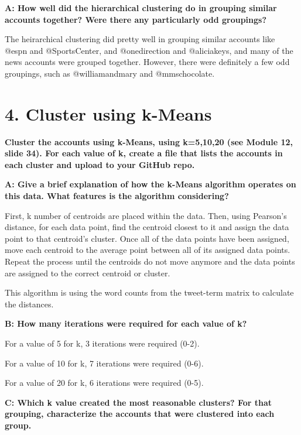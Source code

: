 \documentclass[12pt]{article}
\begin{document}
\clearpage

\noindent \textbf{A: How well did the hierarchical clustering do in grouping similar accounts together? Were there any particularly odd groupings?}

The heirarchical clustering did pretty well in grouping similar accounts like @espn and @SportsCenter, and @onedirection and @aliciakeys, and many of the news accounts were grouped together. However, there were definitely a few odd groupings, such as @williamandmary and @mmschocolate.  

\section*{4. Cluster using k-Means}
\noindent \textbf{Cluster the accounts using k-Means, using k=5,10,20 (see Module 12, slide 34). For each value of k, create a file that lists the accounts in each cluster and upload to your GitHub repo.}

\noindent \textbf{A: Give a brief explanation of how the k-Means algorithm operates on this data. What features is the algorithm considering?}

First, k number of centroids are placed within the data. Then, using Pearson's distance, for each data point, find the centroid closest to it and assign the data point to that centroid's cluster. Once all of the data points have been assigned, move each centroid to the average point between all of its assigned data points. Repeat the process until the centroids do not move anymore and the data points are assigned to the correct centroid or cluster.

This algorithm is using the word counts from the tweet-term matrix to calculate the distances. 

\noindent \textbf{B: How many iterations were required for each value of k?}

For a value of 5 for k, 3 iterations were required (0-2).

For a value of 10 for k, 7 iterations were required (0-6).

For a value of 20 for k, 6 iterations were required (0-5).


\noindent \textbf{C: Which k value created the most reasonable clusters? For that grouping, characterize the accounts that were clustered into each group.}
\end{document}
